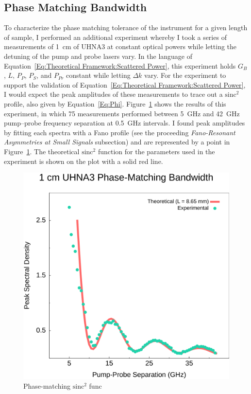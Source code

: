 \subsection{Phase Matching Bandwidth}
\label{Results:Phase Matching Characterization}

To characterize the phase matching tolerance of the instrument for a given length of sample, I performed an additional experiment whereby I took a series of measurements of \SI{1}{\centi\meter} of UHNA3 at constant optical powers while letting the detuning of the pump and probe lasers vary. In the language of Equation~\ref{Eq:Theoretical Framework:Scattered Power}, this experiment holds \(G_B\), \(L\), \(P_P\), \(P_S\), and \(P_{Pr}\) constant while letting \(\Delta k\) vary. For the experiment to support the validation of Equation~\ref{Eq:Theoretical Framework:Scattered Power}, I would expect the peak amplitudes of these measurements to trace out a \(\mathrm{sinc^2}\) profile, also given by Equation~\ref{Eq:Phi}. Figure~\ref{fig:Phase-Match} shows the results of this experiment, in which 75 measurements performed between \SI{5}{\giga\hertz} and \SI{42}{\giga\hertz} pump--probe frequency separation at \SI{0.5}{\giga\hertz} intervals. I found peak amplitudes by fitting each spectra with a Fano profile (see the proceeding \textit{Fano-Resonant Asymmetries at Small Signals} subsection) and are represented by a point in Figure~\ref{fig:Phase-Match}. The theoretical \(\mathrm{sinc^2}\) function for the parameters used in the experiment is shown on the plot with a solid red line.


\begin{figure}[t]
\centering
\includegraphics[width=\textwidth]{figs/4-CABS/Phase-Match.pdf}
\caption{Phase-matching \(\mathrm{sinc^2}\) func}
\label{fig:Phase-Match}
\end{figure}

